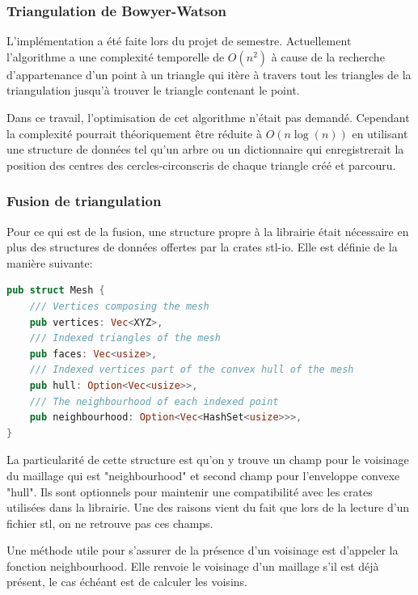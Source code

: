 \subsubsection{Triangulation de Bowyer-Watson}

L'implémentation a été faite lors du projet de semestre. 
Actuellement l'algorithme a une complexité temporelle de $O(n^2)$ à cause de la 
recherche d'appartenance d'un point à un triangle qui itère à travers tout les
triangles de la triangulation jusqu'à trouver le triangle contenant le point.

Dans ce travail, l'optimisation de cet algorithme n'était pas demandé.
Cependant la complexité pourrait théoriquement être réduite à $O(n \log(n))$ en
utilisant une structure de données tel qu'un arbre ou un dictionnaire
qui enregistrerait la position des centres des
cercles-circonscris de chaque triangle créé et parcouru.

\subsubsection{Fusion de triangulation}

Pour ce qui est de la fusion, une structure propre à la librairie était nécessaire en plus des structures de données offertes par la crates stl-io.
Elle est définie de la manière suivante:

\begin{lstlisting}[language=Rust, style=boxed]
pub struct Mesh {
    /// Vertices composing the mesh
    pub vertices: Vec<XYZ>,
    /// Indexed triangles of the mesh
    pub faces: Vec<usize>,
    /// Indexed vertices part of the convex hull of the mesh
    pub hull: Option<Vec<usize>>,
    /// The neighbourhood of each indexed point
    pub neighbourhood: Option<Vec<HashSet<usize>>>,
}
\end{lstlisting}

La particularité de cette structure est qu'on y trouve un champ pour le voisinage du maillage qui est "neighbourhood" et second champ pour l'enveloppe convexe "hull".
Ils sont optionnels pour maintenir une compatibilité avec les crates utilisées dans la librairie.
Une des raisons vient du fait que lors de la lecture d'un fichier \gls{stl}, on ne retrouve pas ces champs. 

Une méthode utile pour s'assurer de la présence d'un voisinage est d'appeler la fonction neighbourhood.
Elle renvoie le voisinage d'un maillage s'il est déjà présent, le cas échéant est de calculer les voisins.

